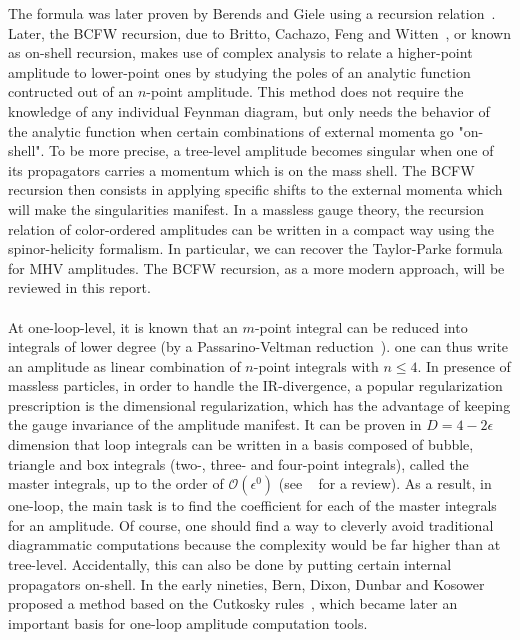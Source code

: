 The formula was later proven by Berends and Giele using a recursion relation~\cite{BERENDS1988759,KOSOWER199023}.
Later, the BCFW recursion, due to Britto, Cachazo, Feng and Witten~\cite{BRITTO2005499, PhysRevLett.94.181602}, or known as on-shell recursion, makes use of complex analysis to relate a higher-point amplitude to lower-point ones by studying the poles of an analytic function contructed out of an $n$-point amplitude.
This method does not require the knowledge of any individual Feynman diagram, but only needs the behavior of the analytic function when certain combinations of external momenta go "on-shell". 
To be more precise, a tree-level amplitude becomes singular when one of its propagators carries a momentum which is on the mass shell. 
The BCFW recursion then consists in applying specific shifts to the external momenta which will make the singularities manifest.
In a massless gauge theory, the recursion relation of color-ordered amplitudes can be written in a compact way using the spinor-helicity formalism.
In particular, we can recover the Taylor-Parke formula for MHV amplitudes.
The BCFW recursion, as a more modern approach, will be reviewed in this report.
\\\\
At one-loop-level,
it is known that an $m$-point integral can be reduced into integrals of lower degree (\eg by a Passarino-Veltman reduction~\cite{PASSARINO1979151}). 
one can thus write an amplitude as linear combination of $n$-point integrals with $n\leq 4$.
In presence of massless particles, in order to handle the IR-divergence, a popular regularization prescription is the dimensional regularization, which has the advantage of keeping the gauge invariance of the amplitude manifest.
It can be proven in $D = 4-2\epsilon$ dimension that loop integrals can be written in a basis composed of bubble, triangle and box integrals (\ie two-, three- and four-point integrals), called the master integrals, up to the order of $\mathcal{O}(\epsilon^0)$ (see \eg~\cite{Gluza:2010ws} for a review).
As a result, in one-loop, the main task is to find the coefficient for each of the master integrals for an amplitude.
Of course, one should find a way to cleverly avoid traditional diagrammatic computations because the complexity would be far higher than at tree-level.
Accidentally, this can also be done by putting certain internal propagators on-shell.
In the early nineties, Bern, Dixon, Dunbar and Kosower~\cite{Bern:1994zx} proposed a method based on the Cutkosky rules~\cite{doi:10.1063/1.1703676},  
which became later an important basis for one-loop amplitude computation tools.
